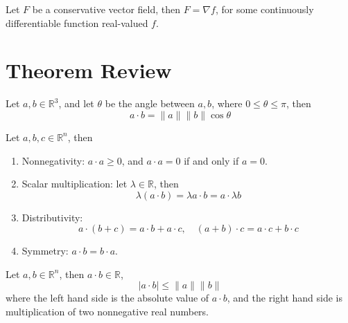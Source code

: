 \documentclass[openany]{book}
\newcommand{\R}{\mathbb{R}}
\begin{document}
\begin{defn}
    Let $F$ be a conservative vector field, then $F=\nabla f$, for some continuously differentiable function real-valued $f$.
\end{defn}



\chapter{Theorem Review}



\begin{prop}\label{dot}
    Let $a,b\in\R^3$, and let $\theta$ be the angle between $a,b$, where $0\leq\theta\leq\pi$, then 
    \begin{equation*}
        a\cdot b=\|a\|\|b\|\cos\theta
    \end{equation*}
\end{prop}




\begin{prop}
    Let $a,b,c\in\R^n$, then 
    \begin{enumerate}
        \item[(a)] Nonnegativity: $a\cdot a\geq 0$, and $a\cdot a=0$ if and only if $a=0$.
        \item[(b)] Scalar multiplication: let $\lambda\in\R$, then 
        \begin{equation*}
            \lambda(a\cdot b)=\lambda a\cdot b=a\cdot \lambda b
        \end{equation*}
        \item[(c)] Distributivity:
        \begin{equation*}
            a\cdot(b+c)=a\cdot b+a\cdot c, \quad (a+b)\cdot c=a\cdot c+b\cdot c
        \end{equation*}
        \item[(d)] Symmetry: $a\cdot b=b\cdot a$.
    \end{enumerate}
\end{prop}



\begin{prop}
    Let $a,b\in\R^n$, then $a\cdot b\in\R$, 
    \begin{equation*}
        |a\cdot b|\leq\|a\|\|b\|
    \end{equation*}
    where the left hand side is the absolute value of $a\cdot b$, and the right hand side is multiplication of two nonnegative real numbers.
\end{prop}
\end{document}
